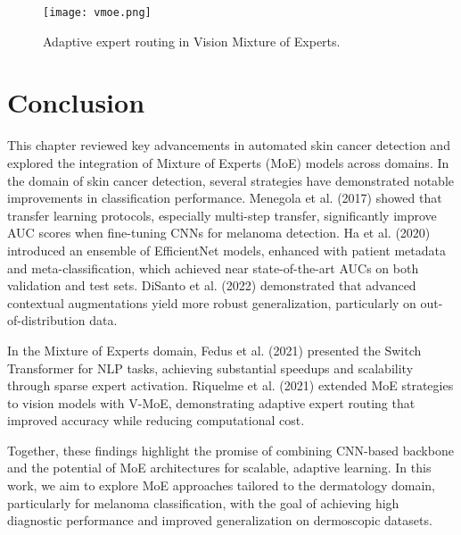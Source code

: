 \begin{figure}[ht]
  \centering
  \texttt{[image: vmoe.png]}
  \caption{Adaptive expert routing in Vision Mixture of Experts.}
  \label{fig:vmoe-routing}
\end{figure}

\section{Conclusion}

This chapter reviewed key advancements in automated skin cancer detection and explored the integration of Mixture of Experts (MoE) models across domains. In the domain of skin cancer detection, several strategies have demonstrated notable improvements in classification performance. Menegola et al. (2017) showed that transfer learning protocols, especially multi-step transfer, significantly improve AUC scores when fine-tuning CNNs for melanoma detection. Ha et al. (2020) introduced an ensemble of EfficientNet models, enhanced with patient metadata and meta-classification, which achieved near state-of-the-art AUCs on both validation and test sets. DiSanto et al. (2022) demonstrated that advanced contextual augmentations yield more robust generalization, particularly on out-of-distribution data.

In the Mixture of Experts domain, Fedus et al. (2021) presented the Switch Transformer for NLP tasks, achieving substantial speedups and scalability through sparse expert activation. Riquelme et al. (2021) extended MoE strategies to vision models with V-MoE, demonstrating adaptive expert routing that improved accuracy while reducing computational cost.

Together, these findings highlight the promise of combining CNN-based backbone  and the potential of MoE architectures for scalable, adaptive learning. In this work, we aim to explore MoE approaches tailored to the dermatology domain, particularly for melanoma classification, with the goal of achieving high diagnostic performance and improved generalization on  dermoscopic datasets.